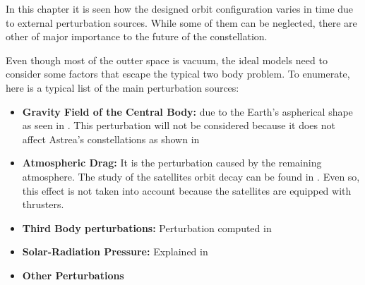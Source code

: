 \label{TypesPerturb}

In this chapter it is seen how the designed orbit configuration varies in time due to external perturbation sources. While some of them can be neglected, there are other of major importance to the future of the constellation.

Even though most of the outter space is vacuum, the ideal models need to consider some factors that escape the typical two body problem. To enumerate, here is a typical list of the main perturbation sources:

\begin{itemize}
\item \textbf{Gravity Field of the Central Body:} due to the Earth's aspherical shape as seen in \cite[Chapter 4, Section 1]{annex1}. This perturbation will not be considered because it does not affect Astrea's constellations as shown in \cite[Chapter 4, Section 3]{annex1}
\item \textbf{Atmospheric Drag:} It is the perturbation caused by the remaining atmosphere. The study of the satellites orbit decay can be found in \cite[Chapter 4, Section 3]{annex1}. Even so, this effect is not taken into account because the satellites are equipped with thrusters.
\item \textbf{Third Body perturbations:} Perturbation computed in \cite[Chapter 4, Section 1]{annex1}
\item \textbf{Solar-Radiation Pressure:} Explained in \cite[Chapter 4, Section 3]{annex1}
\item \textbf{Other Perturbations}
\end{itemize}